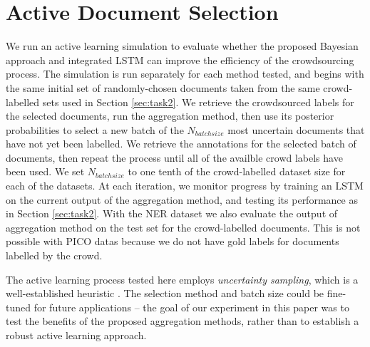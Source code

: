 \section{Active Document Selection}

We run an active learning simulation to evaluate whether the proposed Bayesian approach and integrated LSTM
can improve the efficiency of the crowdsourcing process. 
The simulation is run separately for each method tested, and begins with the same initial set of randomly-chosen
documents taken from the same crowd-labelled sets used in Section \ref{sec:task2}.
We retrieve the crowdsourced labels for the selected documents, run the aggregation method,
then use its posterior probabilities to select a new batch of the $N_{batchsize}$ most uncertain documents that have not yet been labelled. 
We retrieve the annotations for the selected batch of documents, then repeat the process until
all of the availble crowd labels have been used.
We set $N_{batchsize}$ to one tenth of the crowd-labelled dataset size for each of the datasets. At each iteration,
we monitor progress by training an LSTM on the current output of the aggregation method, 
and testing its performance as in Section \ref{sec:task2}. 
With the NER dataset we also evaluate the output of aggregation method on the test set for the crowd-labelled documents. 
This is not possible with PICO datas because we do not have gold labels for documents labelled by the crowd.

The active learning process tested here employs \emph{uncertainty sampling}, which is a well-established heuristic \cite{active learning paper -- see tacl paper?}. The selection method and batch size could be fine-tuned for future applications -- the goal of our experiment in this paper was to test the benefits of the proposed aggregation methods,
rather than to establish a robust active learning approach.
 
